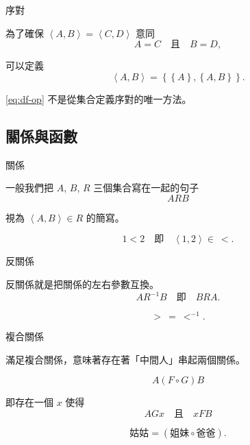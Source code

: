 \documentclass{Slideshow}
\begin{document}
\begin{frame}{序對}
    \begin{definition}
        為了確保 $\left\langle A, B \right\rangle = \left\langle C, D \right\rangle$ 意同
        \[ A = C \quad \mbox{且} \quad B = D,\]

        可以定義
        \begin{equation}
            \left\langle A, B \right\rangle =
            \left\{ \left\{ A \right\}, \left\{ A, B \right\} \right\}.
            \label{eq:df-op}
        \end{equation}
    \end{definition}

    \eqref{eq:df-op} 不是從集合定義序對的唯一方法。
\end{frame}

\subsection{關係與函數}
\begin{frame}{關係}
    \begin{definition}
        一般我們把 $A$, $B$, $R$ 三個集合寫在一起的句子
        \[ ARB \]

        視為 $\left\langle A, B \right\rangle \in R$ 的簡寫。
    \end{definition}

    \begin{example}
        \[ 1 < 2 \quad \mbox{即} \quad \left\langle 1, 2 \right\rangle \in\ < .\]
    \end{example}
\end{frame}

\begin{frame}{反關係}
    \begin{definition}
        反關係就是把關係的左右參數互換。
        \[ A R^{-1} B \quad \mbox{即} \quad BRA.\]
    \end{definition}

    \begin{example}
        \[ > \ = \ <^{-1}.\]
    \end{example}
\end{frame}

\begin{frame}{複合關係}
    \begin{definition}
        滿足複合關係，意味著存在著「中間人」串起兩個關係。

        \[ A \left( F \circ G \right) B \]

        即存在一個 $x$ 使得
        \[ AGx \quad \mbox{且} \quad xFB \]
    \end{definition}

    \begin{example}
        \[ \mbox{姑姑} = \left( \mbox{姐妹} \circ \mbox{爸爸} \right). \]
    \end{example}
\end{frame}
\end{document}
